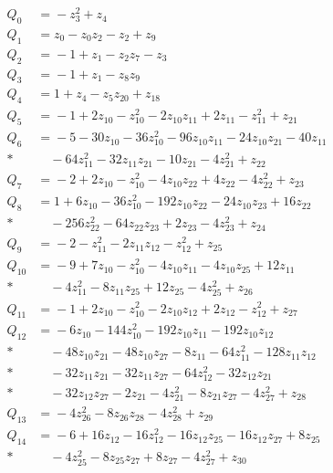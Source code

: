 \begingroup
\small
\setlength{\jot}{3pt}
\begin{align*}
Q_{0} &={}-z_{3}^{2} + z_{4}\\[4pt]
Q_{1} &={}z_{0} - z_{0}z_{2} - z_{2} + z_{9}\\[4pt]
Q_{2} &={}-1 + z_{1} - z_{2}z_{7} - z_{3}\\[4pt]
Q_{3} &={}-1 + z_{1} - z_{8}z_{9}\\[4pt]
Q_{4} &={}1 + z_{4} - z_{5}z_{20} + z_{18}\\[4pt]
Q_{5} &={}-1 + 2z_{10} - z_{10}^{2} - 2z_{10}z_{11} + 2z_{11} - z_{11}^{2} + z_{21}\\[4pt]
Q_{6} &={}-5 - 30z_{10} - 36z_{10}^{2} - 96z_{10}z_{11} - 24z_{10}z_{21} - 40z_{11}\\*
&\quad{} - 64z_{11}^{2} - 32z_{11}z_{21} - 10z_{21} - 4z_{21}^{2} + z_{22}\\[4pt]
Q_{7} &={}-2 + 2z_{10} - z_{10}^{2} - 4z_{10}z_{22} + 4z_{22} - 4z_{22}^{2} + z_{23}\\[4pt]
Q_{8} &={}1 + 6z_{10} - 36z_{10}^{2} - 192z_{10}z_{22} - 24z_{10}z_{23} + 16z_{22}\\*
&\quad{} - 256z_{22}^{2} - 64z_{22}z_{23} + 2z_{23} - 4z_{23}^{2} + z_{24}\\[4pt]
Q_{9} &={}-2 - z_{11}^{2} - 2z_{11}z_{12} - z_{12}^{2} + z_{25}\\[4pt]
Q_{10} &={}-9 + 7z_{10} - z_{10}^{2} - 4z_{10}z_{11} - 4z_{10}z_{25} + 12z_{11}\\*
&\quad{} - 4z_{11}^{2} - 8z_{11}z_{25} + 12z_{25} - 4z_{25}^{2} + z_{26}\\[4pt]
Q_{11} &={}-1 + 2z_{10} - z_{10}^{2} - 2z_{10}z_{12} + 2z_{12} - z_{12}^{2} + z_{27}\\[4pt]
Q_{12} &={}-6z_{10} - 144z_{10}^{2} - 192z_{10}z_{11} - 192z_{10}z_{12}\\*
&\quad{} - 48z_{10}z_{21} - 48z_{10}z_{27} - 8z_{11} - 64z_{11}^{2} - 128z_{11}z_{12}\\*
&\quad{} - 32z_{11}z_{21} - 32z_{11}z_{27} - 64z_{12}^{2} - 32z_{12}z_{21}\\*
&\quad{} - 32z_{12}z_{27} - 2z_{21} - 4z_{21}^{2} - 8z_{21}z_{27} - 4z_{27}^{2} + z_{28}\\[4pt]
Q_{13} &={}-4z_{26}^{2} - 8z_{26}z_{28} - 4z_{28}^{2} + z_{29}\\[4pt]
Q_{14} &={}-6 + 16z_{12} - 16z_{12}^{2} - 16z_{12}z_{25} - 16z_{12}z_{27} + 8z_{25}\\*
&\quad{} - 4z_{25}^{2} - 8z_{25}z_{27} + 8z_{27} - 4z_{27}^{2} + z_{30}\\[4pt]

\end{align*}
